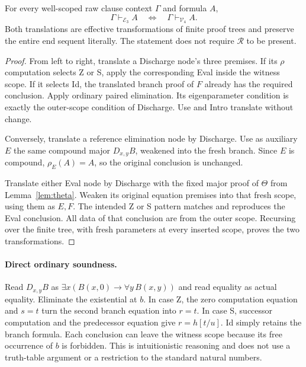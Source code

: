 \begin{theorem}
\label{thm:raw-equivalence}
For every well-scoped raw clause context $\Gamma$ and formula $A$,
\[
               \Gamma\vdash_{\mathcal E_3}A
               \quad\Longleftrightarrow\quad
               \Gamma\vdash_{\mathcal V_4}A.
\]
Both translations are effective transformations of finite proof trees and
preserve the entire end sequent literally. The statement does not require
$\mathcal R$ to be present.
\end{theorem}
\begin{proof}
From left to right, translate a Discharge node's three premises. If its
$\rho$ computation selects Z or S, apply the corresponding Eval inside the
witness scope. If it selects Id, the translated branch proof of $F$ already
has the required conclusion. Apply ordinary paired elimination. Its
eigenparameter condition is exactly the outer-scope condition of Discharge.
Use and Intro translate without change.

Conversely, translate a reference elimination node by Discharge. Use as
auxiliary $E$ the same compound major $D_{x,y}B$, weakened into the fresh
branch. Since $E$ is compound, $\rho_E(A)=A$, so the original conclusion
is unchanged.

Translate either Eval node by Discharge with the fixed major proof of
$\Theta$ from Lemma~\ref{lem:theta}. Weaken its original equation premises
into that fresh scope, using them as $E,F$. The intended Z or S pattern
matches and reproduces the Eval conclusion. All data of that conclusion
are from the outer scope. Recursing over the finite tree, with fresh
parameters at every inserted scope, proves the two transformations.
\end{proof}

\paragraph{Direct ordinary soundness.}
Read $D_{x,y}B$ as
$\exists x(B(x,0)\to\forall y\,B(x,y))$ and read equality as actual
equality. Eliminate the existential at $b$. In case Z, the zero computation
equation and $s=t$ turn the second branch equation into $r=t$.
In case S, successor computation and the predecessor equation give
$r=h[t/u]$. Id simply retains the branch formula. Each conclusion can
leave the witness scope because its free occurrence of $b$ is forbidden.
This is intuitionistic reasoning and does not use a truth-table argument
or a restriction to the standard natural numbers.

